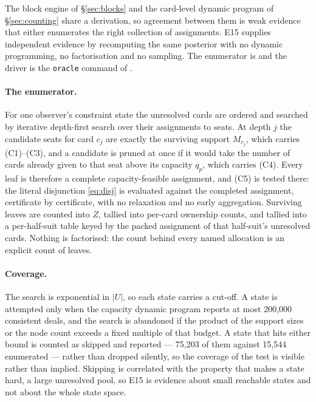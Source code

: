 \documentclass[11pt]{article}
\theoremstyle{definition}
\newcommand{\numOracleStates}{15{,}544}
\newcommand{\numOracleStatesSkipped}{75{,}203}
\newcommand{\numOracleMaxDeals}{200{,}000}
\begin{document}
The block engine of \S\ref{sec:blocks} and the card-level dynamic program of
\S\ref{sec:counting} share a derivation, so agreement between them is weak
evidence that either enumerates the right collection of assignments. E15 supplies
independent evidence by recomputing the same posterior with no dynamic
programming, no factorisation and no sampling. The enumerator is
 and the driver is the \texttt{oracle} command of
.

\paragraph{The enumerator.} For one observer's constraint state the unresolved
cards are ordered and searched by iterative depth-first search over their
assignments to seats. At depth $j$ the candidate seats for card $c_j$ are exactly
the surviving support $M_{c_j}$, which carries (C1)--(C3), and a candidate is
pruned at once if it would take the number of cards already given to that seat
above its capacity $q_p$, which carries (C4). Every leaf is therefore a complete
capacity-feasible assignment, and (C5) is tested there: the literal disjunction
\eqref{eq:disj} is evaluated against the completed assignment, certificate by
certificate, with no relaxation and no early aggregation. Surviving leaves are
counted into $Z$, tallied into per-card ownership counts, and tallied into a
per-half-suit table keyed by the packed assignment of that half-suit's unresolved
cards. Nothing is factorised: the count behind every named allocation is an
explicit count of leaves.

\paragraph{Coverage.} The search is exponential in $|U|$, so each state carries a
cut-off. A state is attempted only when the capacity dynamic program reports at
most \numOracleMaxDeals{} consistent deals, and the search is abandoned if the
product of the support sizes or the node count exceeds a fixed multiple of that
budget. A state that hits either bound is counted as skipped and reported ---
\numOracleStatesSkipped{} of them against \numOracleStates{} enumerated --- rather
than dropped silently, so the coverage of the test is visible rather than implied.
Skipping is correlated with the property that makes a state hard, a large
unresolved pool, so E15 is evidence about small reachable states and not about
the whole state space.
\end{document}
